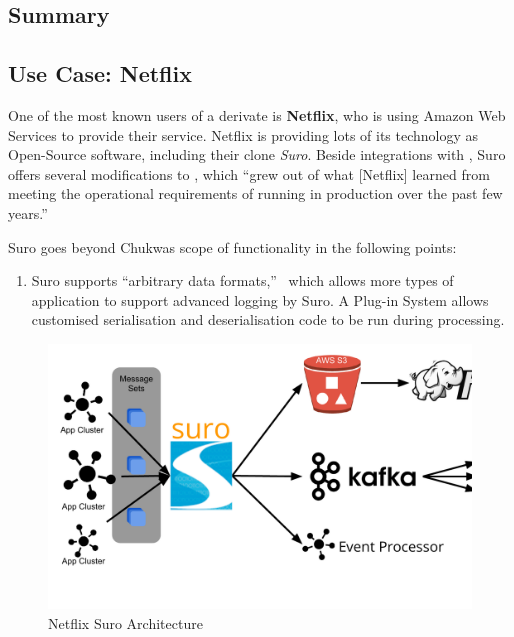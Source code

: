 \subsection{Summary}

\subsection{Use Case: Netflix}
One of the most known users of a \chuk derivate is \textbf{Netflix}, who is using Amazon Web Services to provide their service. 
Netflix is providing lots of its technology as Open-Source software, including their \chuk clone \textit{Suro}. 
Beside integrations with \noss, Suro offers several modifications to \chuk, which ``grew out of what [Netflix] learned from meeting the operational requirements of running in production over the past few years.''~\cite{Bae2013}

Suro goes beyond Chukwas scope of functionality in the following points:
\begin{enumerate}
  \item Suro supports ``arbitrary data formats,''~\cite{Bae2013} which allows more types of application to support advanced logging by Suro. A Plug-in System allows customised serialisation and deserialisation code to be run during processing.
\end{enumerate}

\label{netflix}
\begin{figure}[hbt]
  \centering
  \includegraphics[width=\linewidth,clip=true,trim=5mm 2cm 0 5mm]{images/NetflixSuro}
  \caption{Netflix Suro Architecture~\cite{Bae2013, Harris2013}}
  \label{fig:SuroArchitecture}
\end{figure}


